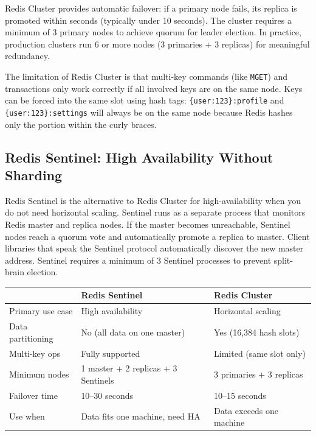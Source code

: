 \documentclass[11pt,a4paper]{article}
\begin{document}
Redis Cluster provides automatic failover: if a primary node fails, its replica is promoted within seconds (typically under 10 seconds). The cluster requires a minimum of 3 primary nodes to achieve quorum for leader election. In practice, production clusters run 6 or more nodes (3 primaries + 3 replicas) for meaningful redundancy.

The limitation of Redis Cluster is that multi-key commands (like \texttt{MGET}) and transactions only work correctly if all involved keys are on the same node. Keys can be forced into the same slot using hash tags: \texttt{\{user:123\}:profile} and \texttt{\{user:123\}:settings} will always be on the same node because Redis hashes only the portion within the curly braces.

\subsection{Redis Sentinel: High Availability Without Sharding}

Redis Sentinel is the alternative to Redis Cluster for high-availability when you do not need horizontal scaling. Sentinel runs as a separate process that monitors Redis master and replica nodes. If the master becomes unreachable, Sentinel nodes reach a quorum vote and automatically promote a replica to master. Client libraries that speak the Sentinel protocol automatically discover the new master address. Sentinel requires a minimum of 3 Sentinel processes to prevent split-brain election.

\begin{tabularx}{\linewidth}{lXX}
\toprule
 & \textbf{Redis Sentinel} & \textbf{Redis Cluster} \\
\midrule
Primary use case & High availability & Horizontal scaling \\
Data partitioning & No (all data on one master) & Yes (16,384 hash slots) \\
Multi-key ops & Fully supported & Limited (same slot only) \\
Minimum nodes & 1 master + 2 replicas + 3 Sentinels & 3 primaries + 3 replicas \\
Failover time & 10--30 seconds & 10--15 seconds \\
Use when & Data fits one machine, need HA & Data exceeds one machine \\
\bottomrule
\end{tabularx}

\end{document}
